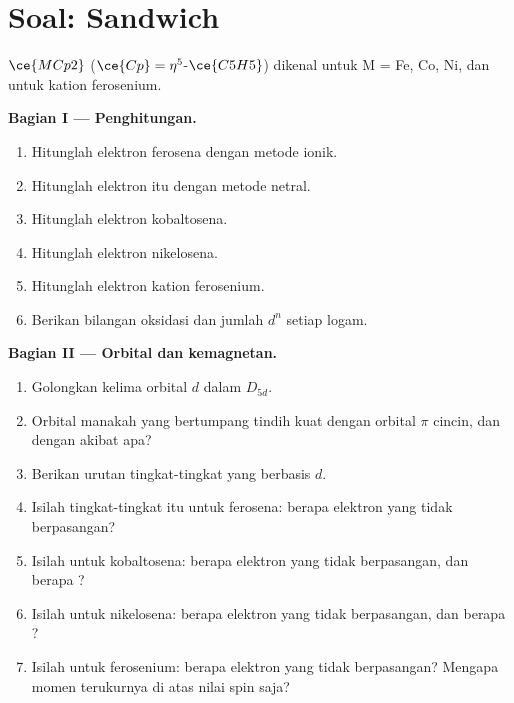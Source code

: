 \section{Soal: Sandwich}

\begin{problem}
\label{pb:b3:organometallic-bonding:1}
 $\ce{MCp2}$ ($\ce{Cp} = \eta^5$-$\ce{C5H5}$) dikenal untuk M = Fe, Co, Ni, dan untuk kation ferosenium.

\medskip\noindent\textbf{Bagian I --- Penghitungan.}
\begin{enumerate}[beginpenalty=10000]
  \item Hitunglah elektron ferosena dengan metode ionik.
  \item Hitunglah elektron itu dengan metode netral.
  \item Hitunglah elektron kobaltosena.
  \item Hitunglah elektron nikelosena.
  \item Hitunglah elektron kation ferosenium.
  \item Berikan bilangan oksidasi dan jumlah $d^n$ setiap logam.
\end{enumerate}

\medskip\noindent\textbf{Bagian II --- Orbital dan kemagnetan.}
\begin{enumerate}[resume, beginpenalty=10000]
  \item Golongkan kelima orbital $d$ dalam $D_{5d}$.
  \item Orbital manakah yang bertumpang tindih kuat dengan orbital $\pi$ cincin, dan dengan akibat
        apa?
  \item Berikan urutan tingkat-tingkat yang berbasis $d$.
  \item Isilah tingkat-tingkat itu untuk ferosena: berapa elektron yang tidak berpasangan?
  \item Isilah untuk kobaltosena: berapa elektron yang tidak berpasangan, dan berapa ?
  \item Isilah untuk nikelosena: berapa elektron yang tidak berpasangan, dan berapa ?
  \item Isilah untuk ferosenium: berapa elektron yang tidak berpasangan? Mengapa momen terukurnya
        di atas nilai spin saja?
\end{enumerate}


\end{problem}
